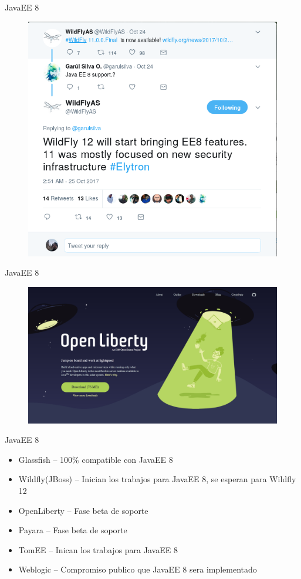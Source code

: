 \documentclass{beamer}
\begin{document}
\begin{frame}{JavaEE 8}
\begin{figure}
\centering
\includegraphics[width=0.7\linewidth]{Images/wildflyee8}
\end{figure}
\end{frame}


\begin{frame}{JavaEE 8}
\begin{figure}
\centering
\includegraphics[width=\linewidth]{Images/liberty}
\end{figure}
\end{frame}

\begin{frame}{JavaEE 8}
\begin{itemize}
\item Glassfish – 100\% compatible con JavaEE 8
\item Wildfly(JBoss) – Inician los trabajos para JavaEE 8, se esperan para Wildfly 12
\item OpenLiberty – Fase beta de soporte
\item Payara – Fase beta de soporte
\item TomEE – Inican los trabajos para JavaEE 8
\item Weblogic – Compromiso publico que JavaEE 8 sera implementado
\end{itemize}
\end{frame}
\end{document}
